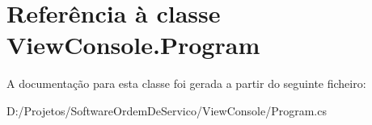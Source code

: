 \hypertarget{class_view_console_1_1_program}{}\section{Referência à classe View\+Console.\+Program}
\label{class_view_console_1_1_program}


A documentação para esta classe foi gerada a partir do seguinte ficheiro\+:\begin{DoxyCompactItemize}
\item 
D\+:/\+Projetos/\+Software\+Ordem\+De\+Servico/\+View\+Console/Program.\+cs\end{DoxyCompactItemize}
